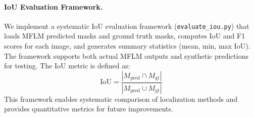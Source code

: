 \paragraph{IoU Evaluation Framework.} We implement a systematic IoU evaluation framework (\texttt{evaluate\_iou.py}) that loads MFLM predicted masks and ground truth masks, computes IoU and F1 scores for each image, and generates summary statistics (mean, min, max IoU). The framework supports both actual MFLM outputs and synthetic predictions for testing. The IoU metric is defined as:
\begin{equation}
\text{IoU} = \frac{|M_{\text{pred}} \cap M_{\text{gt}}|}{|M_{\text{pred}} \cup M_{\text{gt}}|}
\end{equation}
This framework enables systematic comparison of localization methods and provides quantitative metrics for future improvements.
